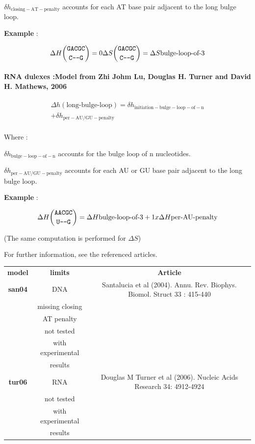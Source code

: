 \documentclass{article}
\begin{document}
$\delta{}h_\mathrm{closing-AT-penalty}$ accounts for each AT base pair adjacent
to the long bulge loop.

\textbf{Example} :

\begin{multline*}
\Delta H {\mbox{\texttt{GACGC}} \choose \mbox{\texttt{C---G}}} =
0
\Delta S {\mbox{\texttt{GACGC}} \choose \mbox{\texttt{C---G}}} =
\Delta S {\mbox{bulge-loop-of-3}} \\
\end{multline*}

\paragraph{RNA dulexes :\textbf{Model from Zhi Johm Lu, Douglas H. Turner and David H. Mathews, 2006}} 

\begin{multline*}
\Delta h {(\mbox{long-bulge-loop})} =
\delta{}h_\mathrm{initiation-bulge-loop-of-n} \\ +
\delta{}h_\mathrm{per-AU/GU-penalty}\\
\end{multline*}


Where :

$\delta{}h_\mathrm{bulge-loop-of-n}$ accounts for the bulge loop of n nucleotides.

$\delta{}h_\mathrm{per-AU/GU-penalty}$ accounts for each AU or GU base pair adjacent
to the long bulge loop.


\textbf{Example} :

\begin{multline*}
\Delta H {\mbox{\texttt{AACGC}} \choose \mbox{\texttt{U---G}}} =
\Delta H {\mbox{bulge-loop-of-3}} +
1 x \Delta H {\mbox{per-AU-penalty}} \\
\end{multline*}

       (The same computation is performed for $\Delta S$) 

For further information, see the referenced articles.

\begin{table}[h]
\begin{tabular}[h]{| c | c | c |}
\textbf{model} & \textbf{limits} & \textbf{Article} \\
\textbf{san04} & DNA & Santalucia et al (2004). Annu. Rev. Biophys. Biomol. Struct 33 : 415-440\\
 & missing closing & \\
 & AT penalty & \\
 & not tested & \\
 & with experimental & \\
 & results & \\
\textbf{tur06} & RNA & Douglas M Turner et al (2006). Nucleic Acids Research 34: 4912-4924 \\
 & not tested & \\
 & with experimental & \\
 & results & \\
\end{tabular}
\end{table}
\end{document}
